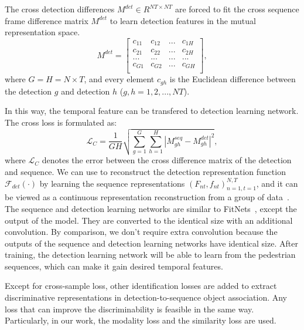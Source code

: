 \documentclass[times,twocolumn,final,authoryear]{elsarticle}
\begin{document}
The cross detection differences $M^{det}\in R^{NT\times NT}$ are forced to fit the cross sequence frame difference matrix $M^{det}$ to learn detection {features} in the mutual representation space.
\begin{equation}\label{eq:m_det}
M^{det}={
	\left[ \begin{array}{cccc}
	c_{11} & c_{12} & ... & c_{1H}\\
	c_{21} & c_{22} & ... & c_{2H}\\
	... & ... & ... & ... \\
	c_{G1} & c_{G2} & ... & c_{GH}\\
	\end{array} 
	\right ]},
\end{equation}
where $G=H=N \times T$, and every element $c_{gh}$ is the Euclidean difference between the detection $g$ and detection $h$ ($g,h=1,2,...,NT$).

{
In this way, the temporal feature can be transfered to detection learning network.}
The cross loss is formulated as:
\begin{equation}\label{eq:m_cross}
\mathcal{L}_C=\frac{1}{G H} \sqrt{ \sum_{g=1}^{G} \sum_{h=1}^{H} | M_{gh}^{seq}-M_{gh}^{det} |^2 },
\end{equation}
where $\mathcal{L}_C$ denotes the error between the cross difference matrix of the detection and sequence.
We can use  to reconstruct the detection representation function $\mathcal{F}_{det}(\cdot)$ by learning the sequence representations ${(F_{nt},f_{nt})}_{n=1,t=1}^{N,T}$,
and it can be viewed as a continuous representation reconstruction from a group of data~\citep{RN987,RN988}.
The sequence and detection learning networks are similar to FitNets~\citep{romero2015fitnets}, except the output of the model. 
They are converted to the identical size with an additional convolution.
By comparison, we don't require extra convolution because the outputs of the sequence and detection learning networks have identical size.
After training, the detection learning network will be able to learn from the pedestrian sequences, which can make it gain desired temporal features.

Except for cross-sample loss, other identification losses are added to extract discriminative representations in detection-to-sequence object association.
Any loss that can improve the discriminability is feasible in the same way.
Particularly, in our work, the modality loss and the similarity loss are used.

\vspace{3pt}
\noindent
\end{document}
